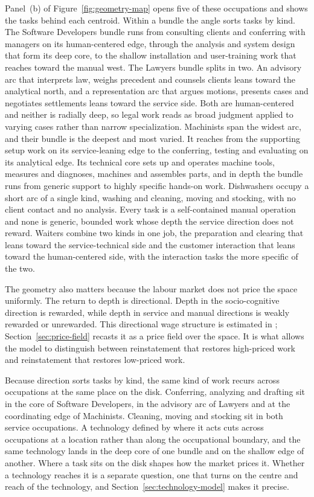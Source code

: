 \documentclass[12pt, a4paper]{article}
\begin{document}
Panel~(b) of Figure~\ref{fig:geometry-map} opens five of these
occupations and shows the tasks behind each centroid. Within a bundle the
angle sorts tasks by kind. The Software Developers bundle runs from
consulting clients and conferring with managers on its human-centered
edge, through the analysis and system design that form its deep core, to
the shallow installation and user-training work that reaches toward the
manual west. The Lawyers bundle splits in two. An advisory arc that
interprets law, weighs precedent and counsels clients leans toward the
analytical north, and a representation arc that argues motions, presents
cases and negotiates settlements leans toward the service side. Both are
human-centered and neither is radially deep, so legal work reads as broad
judgment applied to varying cases rather than narrow specialization.
Machinists span the widest arc, and their bundle is the deepest and most
varied. It reaches from the supporting setup work on its service-leaning
edge to the conferring, testing and evaluating on its analytical edge.
Its technical core sets up and operates machine tools, measures and
diagnoses, machines and assembles parts, and in depth the bundle runs
from generic support to highly specific hands-on work. Dishwashers occupy
a short arc of a single kind, washing and cleaning, moving and stocking,
with no client contact and no analysis. Every task is a self-contained
manual operation and none is generic, bounded work whose depth the
service direction does not reward. Waiters combine two kinds in one job,
the preparation and clearing that leans toward the service-technical side
and the customer interaction that leans toward the human-centered side,
with the interaction tasks the more specific of the two.

The geometry also matters because the labour market does not price the
space uniformly. The return to depth is directional. Depth in the
socio-cognitive direction is rewarded, while depth in service and manual
directions is weakly rewarded or unrewarded. This directional wage
structure is estimated in \textcite{storck2026geometry}; Section~\ref{sec:price-field}
recasts it as a price field over the space. It is what allows the model to
distinguish between reinstatement that restores high-priced work and
reinstatement that restores low-priced work.

Because direction sorts tasks by kind, the same kind of work recurs
across occupations at the same place on the disk. Conferring, analyzing
and drafting sit in the core of Software Developers, in the advisory arc
of Lawyers and at the coordinating edge of Machinists. Cleaning, moving
and stocking sit in both service occupations. A technology defined by
where it acts cuts across occupations at a location rather than along the
occupational boundary, and the same technology lands in the deep core of
one bundle and on the shallow edge of another. Where a task sits on the
disk shapes how the market prices it. Whether a technology reaches it is a
separate question, one that turns on the centre and reach of the
technology, and Section~\ref{sec:technology-model} makes it precise.
\end{document}
